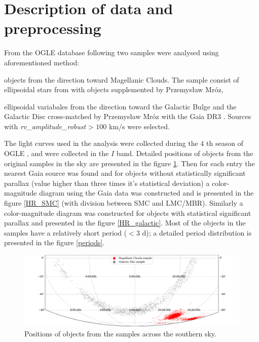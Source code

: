 \documentclass{pracalicmgr}
\newenvironment{itemize*}%
  {\vspace{-\topsep}
    \begin{itemize}%
    \setlength{\itemsep}{0pt}%
    \setlength{\parskip}{0pt}}%
  {\end{itemize}
  \vspace{-\topsep}}
\begin{document}
\section{Description of data and preprocessing}
From the OGLE \citep{udalski_optical_1992} database following two samples were analysed using aforementioned method:
\begin{itemize*}
    \item objects from the direction toward Magellanic Clouds. The sample consist of ellipsoidal stars from \citet{pawlak_ogle_2016} with objects supplemented 
    by Przemysław Mróz, 
    \item ellipsoidal variabales from the direction toward the Galactic Bulge and the Galactic Disc cross-matched by Przemysław Mróz with the Gaia DR3 
    \citep{gaia_collaboration_gaia_2022}. Sources with  {\it{rv\_amplitude\_robust}} > $100$ km/s were selected.
\end{itemize*}
The light curves used in the analysis were collected during the $4$ th season of OGLE \citet{udalski_ogle-iv_2015},
and were collected in the $I$ band.
Detailed positions of objects from the original samples in the sky are presented in the figure \ref{map}. Then for each entry the nearest Gaia source
was found and for objects without statistically significant parallax (value higher than three times it's statistical deviation) a color-magnitude
diagram using the Gaia data was constructed and is presented in the figure \ref{HR_SMC} (with division between SMC and LMC/MBR). Similarly a color-magnitude diagram was constructed for
objects with statistical significant parallax and presented in the figure \ref{HR_galactic}.
Most of the objects in the samples have a relatively short period ($<3$ d); a detailed period distribution
is presented in the figure \ref{periods}.
\begin{figure}
    \begin{center}
        \includegraphics[scale=0.52]{plots/map_sample.png}
    \end{center}
    \caption{Positions of objects from the samples across the southern sky.}
    \label{map}
\end{figure}
\end{document}
